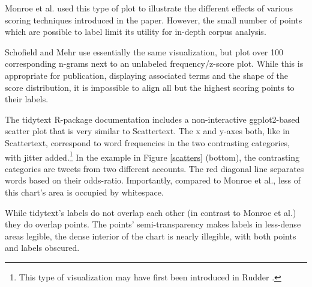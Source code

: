 \documentclass[11pt,a4paper]{article}
\begin{document}
Monroe et al.  used this type of plot to illustrate the different effects of various scoring techniques introduced in the paper.  However, the small number of points which are possible to label limit its utility for in-depth corpus analysis.  

Schofield and Mehr  use essentially the same visualization, but plot over 100 corresponding n-grams next to an unlabeled frequency/z-score plot.  While this is appropriate for publication, displaying associated terms and the shape of the score distribution, it is impossible to align all but the highest scoring points to their labels. 

The tidytext R-package \cite{tidytext} documentation includes a non-interactive ggplot2-based scatter plot that is very similar to Scattertext.   The x and y-axes both, like in Scattertext, correspond to word frequencies in the two contrasting categories, with jitter added.\footnote{This type of visualization may have first been introduced in Rudder .}  In the example in Figure \ref{scatters} (bottom), the contrasting categories are tweets from two different accounts.  The red diagonal line separates words based on their odds-ratio.  Importantly, compared to Monroe et al., less of this chart's area is occupied by whitespace. 

While tidytext's labels do not overlap each other (in contrast to Monroe et al.) they do overlap points.  The points' semi-transparency makes labels in less-dense areas legible, the dense interior of the chart is nearly illegible, with both points and labels obscured. 
\end{document}
